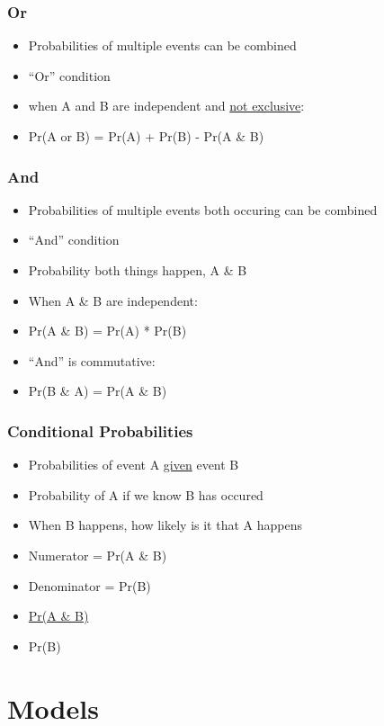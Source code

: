 \documentclass[14pt,handout]{beamer}
\begin{document}
\begin{frame}
\frametitle{Or}
\begin{itemize}
	\item<+-> Probabilities of multiple events can be combined
	\item<+-> ``Or'' condition
	\item<+-> when A and B are independent and \underline{not exclusive}:
	\item<+-> Pr(A or B) = Pr(A) + Pr(B) - Pr(A \& B)
\end{itemize}
\end{frame}

\begin{frame}
\frametitle{And}
\begin{itemize}
	\item<+-> Probabilities of multiple events both occuring can be combined
	\item<+-> ``And'' condition
	\item<+-> Probability both things happen, A \& B
	\item<+-> When A \& B are independent:
	\item<+-> Pr(A \& B) = Pr(A) * Pr(B)
	\item<+-> ``And'' is commutative:
	\item<+-> Pr(B \& A) = Pr(A \& B)
\end{itemize}
\end{frame}

\begin{frame}
\frametitle{Conditional Probabilities}
\begin{itemize}
	\item<+-> Probabilities of event A \underline{given} event B
	\item<+-> Probability of A if we know B has occured
	\item<+-> When B happens, how likely is it that A happens
	\item<+-> Numerator = Pr(A \& B)
	\item<+-> Denominator = Pr(B)
	\item<+->[] \underline{Pr(A \& B)}
	\item<+->[] Pr(B)
\end{itemize}
\end{frame}

\section{Models}
\end{document}
